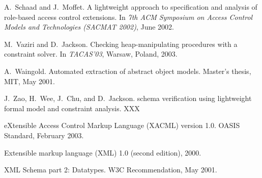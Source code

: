 \documentclass{acm_proc_article-sp}
\begin{document}
\begin{thebibliography}{10}
A.~Schaad and J.~Moffet.
\newblock A lightweight approach to specification and analysis of role-based access control extensions.
\newblock In {\em 7th ACM Symposium on Access Control Models and Technologies (SACMAT 2002)}, June 2002.

M.~Vaziri and D.~Jackson.
\newblock Checking heap-manipulating procedures with a constraint solver.
\newblock In {\em TACAS'03}, Warsaw, Poland, 2003.

A.~Waingold.
\newblock Automated extraction of abstract object models.
\newblock Master's thesis, MIT, May 2001.

J.~Zao, H.~Wee, J.~Chu, and D.~Jackson.
 schema verification using lightweight formal model and constraint analysis.
\newblock XXX

{eXtensible Access Control Markup Language (XACML)} version 1.0.
\newblock OASIS Standard, February 2003.

Extensible markup language ({XML}) 1.0 (second edition), 2000.

{XML Schema} part 2: Datatypes.
\newblock W3C Recommendation, May 2001.

\end{thebibliography}
\end{document}

